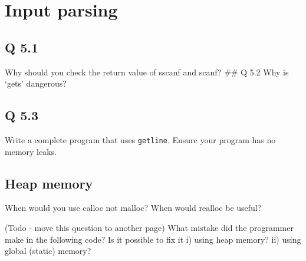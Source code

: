\begin{Shaded}
\begin{Highlighting}[]
  
   \NormalTok{);}
    \NormalTok{_____}
    
\NormalTok{\}}
\end{Highlighting}
\end{Shaded}

\section{Input parsing}\label{input-parsing}

\subsection{Q 5.1}\label{q-5.1}

Why should you check the return value of sscanf and scanf? \#\# Q 5.2
Why is `gets' dangerous?

\subsection{Q 5.3}\label{q-5.3}

Write a complete program that uses \texttt{getline}. Ensure your program
has no memory leaks.

\subsection{Heap memory}\label{heap-memory}

When would you use calloc not malloc? When would realloc be useful?

(Todo - move this question to another page) What mistake did the
programmer make in the following code? Is it possible to fix it i) using
heap memory? ii) using global (static) memory?

\begin{Shaded}
\end{Shaded}

